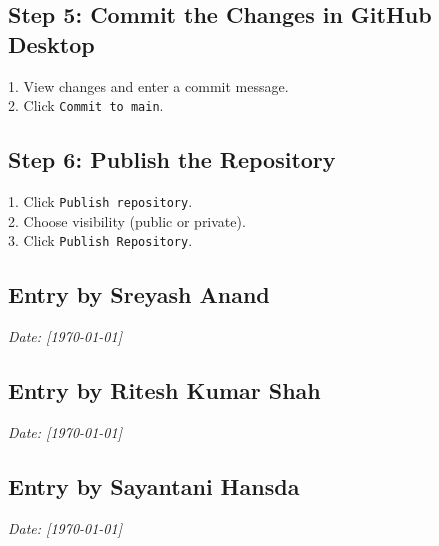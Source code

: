 \documentclass[a4paper,12pt]{article}
\begin{document}
\subsection*{Step 5: Commit the Changes in GitHub Desktop}
1. View changes and enter a commit message.\\
2. Click \texttt{Commit to main}.

\subsection*{Step 6: Publish the Repository}
1. Click \texttt{Publish repository}.\\
2. Choose visibility (public or private).\\
3. Click \texttt{Publish Repository}.

\subsection*{Entry by Sreyash Anand}
\textit{Date: [\today]}\\

\subsection*{Entry by Ritesh Kumar Shah}
\textit{Date: [\today]}\\

\subsection*{Entry by Sayantani Hansda}
\textit{Date: [\today]}\\
\end{document}

